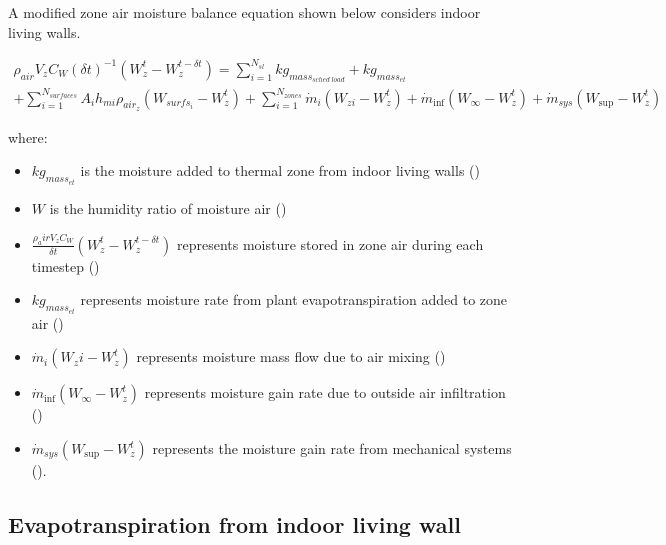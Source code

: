 A modified zone air moisture balance equation shown below considers indoor living walls.

\begin{equation}
\begin{array}{l}{\rho_{air}}{V_z}{C_W}{\left( {\delta t} \right)^{ - 1}}\left( {W_z^t - W_z^{t - \delta t}} \right) = \sum\limits_{i = 1}^{{N_{sl}}} {k{g_{mas{s_{sched\;load}}}}} + kg_{mass_{et}} \\ + \sum\limits_{i = 1}^{{N_{surfaces}}} {{A_i}{h_{mi}}} {\rho_{ai{r_z}}}\left( {{W_{surf{s_i}}} - W_z^t} \right)+ \sum\limits_{i = 1}^{{N_{zones}}} {{{\dot m}_i}} \left( {{W_{zi}} - W_z^t} \right) + {{\dot m}_{\inf }}\left( {{W_\infty } - W_z^t} \right) + {{\dot m}_{sys}}\left( {{W_{\sup }} - W_z^t} \right)\end{array}
\end{equation}

where:

\begin{itemize}
\tightlist
\item
  \(kg_{mass_{et}}\) is the moisture added to thermal zone from indoor living walls (\si{\massFlowRate})
\item
  \(W\) is the humidity ratio of moisture air (\si{\humidityRatio})
\item
  $\frac{\rho_air V_z C_W}{\delta t} \left(W_z^t - W_z^{t-\delta t}\right)$ represents moisture stored in zone air during each timestep (\si{\massFlowRate})
\item
  \(kg_{mass_{et}}\) represents moisture rate from plant evapotranspiration added to zone air (\si{\massFlowRate})
\item
  \({{{\dot m}_i}} \left( {W_zi - W_z^t} \right)\) represents moisture mass flow due to air mixing (\si{\massFlowRate})
\item
  \({{\dot m}_{\inf }}\left( {{W_\infty } - W_z^t} \right)\) represents moisture gain rate due to outside air infiltration (\si{\massFlowRate})
\item
  \({{\dot m}_{sys}}\left( {{W_{\sup }} - W_z^t} \right)\) represents the moisture gain rate from mechanical systems (\si{\massFlowRate}).
\end{itemize}

\subsection{Evapotranspiration from indoor living wall}\label{evaporation-from-indoor-living-wall}

